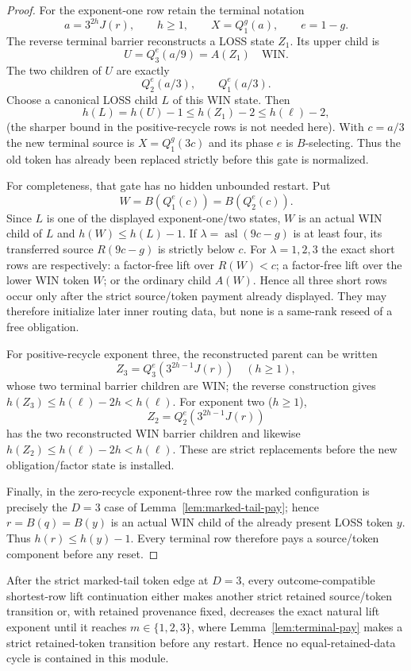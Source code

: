 \begin{proof}
For the exponent-one row retain the terminal notation
\[
 a=3^{2h}J(r),\qquad h\ge1,\qquad X=Q_1^g(a),\qquad e=1-g.
\]
The reverse terminal barrier reconstructs a LOSS state $Z_1$.  Its upper
child is
\[
 U=Q_3^e(a/9)=A(Z_1)\quad\text{WIN}.
\]
The two children of $U$ are exactly
\[
 Q_2^e(a/3),\qquad Q_1^e(a/3).
\]
Choose a canonical LOSS child $L$ of this WIN state.  Then
\[
 h(L)=h(U)-1\le h(Z_1)-2\le h(\ell)-2,
\]
(the sharper bound in the positive-recycle rows is not needed here).  With
$c=a/3$ the new terminal source is $X=Q_1^g(3c)$ and its phase $e$ is
$B$-selecting.  Thus the old token has already been replaced strictly before
this gate is normalized.

For completeness, that gate has no hidden unbounded restart.  Put
\[
 W=B(Q_1^e(c))=B(Q_2^e(c)).
\]
Since $L$ is one of the displayed exponent-one/two states, $W$ is an actual
WIN child of $L$ and $h(W)\le h(L)-1$.  If
$\lambda=\operatorname{asl}(9c-g)$ is at least four, its transferred source
$R(9c-g)$ is strictly below $c$.  For $\lambda=1,2,3$ the exact short rows
are respectively: a factor-free lift over $R(W)<c$; a factor-free lift over
the lower WIN token $W$; or the ordinary child $A(W)$.  Hence all three
short rows occur only after the strict source/token payment already displayed.
They may therefore initialize later inner routing data, but none is a
same-rank reseed of a free obligation.

For positive-recycle exponent three, the reconstructed parent can be written
\[
 Z_3=Q_3^e(3^{2h-1}J(r))\quad(h\ge1),
\]
whose two terminal barrier children are WIN; the reverse construction gives
$h(Z_3)\le h(\ell)-2h<h(\ell)$.  For exponent two ($h\ge1$),
\[
 Z_2=Q_2^e(3^{2h-1}J(r))
\]
has the two reconstructed WIN barrier children and likewise
$h(Z_2)\le h(\ell)-2h<h(\ell)$.  These are strict replacements before the
new obligation/factor state is installed.

Finally, in the zero-recycle exponent-three row the marked configuration is
precisely the $D=3$ case of Lemma~\ref{lem:marked-tail-pay}; hence
$r=B(q)=B(y)$ is an actual WIN child of the already present LOSS token $y$.
Thus $h(r)\le h(y)-1$.  Every terminal row therefore pays a source/token
component before any reset.
\end{proof}

\begin{corollary}[The post-payment $D=3$ lift module is well-founded]
\label{cor:short-lift-closed}
After the strict marked-tail token edge at $D=3$, every outcome-compatible
shortest-row lift continuation either makes another strict retained
source/token transition or, with retained provenance fixed, decreases the
exact natural lift exponent until it reaches $m\in\{1,2,3\}$, where
Lemma~\ref{lem:terminal-pay} makes a strict retained-token transition before
any restart. Hence no equal-retained-data cycle is contained in this module.
\end{corollary}

